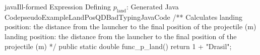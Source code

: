 \begin{pseudocode}{java}{Ill-formed Expression Defining \(p_\text{land}\): Generated Java Code}{pseudoExampleLandPosQDBadTypingJavaCode}
/** \brief Calculates landing position: the distance from the launcher to the final position of the projectile (m)
    \return landing position: the distance from the launcher to the final position of the projectile (m)
*/
public static double func_p_land() {
    return 1 + "Drasil";
}
\end{pseudocode}
